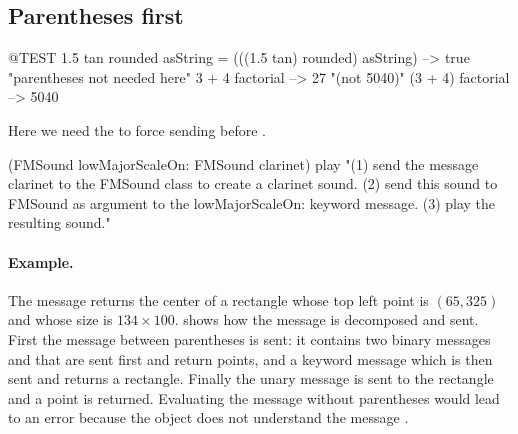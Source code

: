 \documentclass[a4paper,10pt,twoside]{book}
\begin{document}
\subsection{Parentheses first}


\begin{code}{@TEST}
1.5 tan rounded asString = (((1.5 tan) rounded) asString) --> true    "parentheses not needed here"
3 + 4 factorial   --> 27    "(not 5040)"
(3 + 4) factorial --> 5040
\end{code}

Here we need the  to force sending  before .
\begin{code}{}
(FMSound lowMajorScaleOn: FMSound clarinet) play 
"(1) send the message clarinet to the FMSound class to create a clarinet sound.
 (2) send this sound to FMSound as argument to the lowMajorScaleOn: keyword message.
 (3) play the resulting sound."
\end{code}



\paragraph{Example.}
The message  returns the center of a rectangle whose top left point is $(65, 325)$ and whose size is $134{\times}100$.  shows how the message is decomposed and sent. First the message between parentheses is sent: it contains two binary messages  and  that are sent first and return points, and a keyword message  which is then sent and returns a rectangle. Finally the unary message  is sent to the rectangle and a point is returned. 
Evaluating the message without parentheses would lead to an error because the object  does not understand the message .
\end{document}
